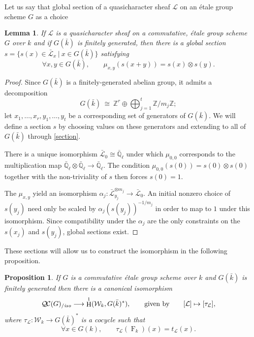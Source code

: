\documentclass[11pt]{amsart}
\theoremstyle{plain}
\newtheorem{proposition}[theorem]{Proposition}
\newtheorem{lemma}[theorem]{Lemma}
\theoremstyle{definition}
\theoremstyle{remark}
\newcommand{\ZZ}{{\mathbb{Z}}}
\newcommand{\EE}{\mathbb{\bar Q}_\ell}
\newcommand{\bFq}{\bar{k}}
\newcommand{\Fq}{k}
\newcommand{\Frob}[1]{\operatorname{F}_{#1}}
\DeclareMathOperator{\Hh}{H}
\newcommand{\cdef}[1]{ {#1}\index{#1} }
\newcommand{\tq}{{\ \vert\ }}
\newcommand{\iso}{{\ \cong\ }}
\newcommand{\cs}[1]{{\mathcal{#1}}}
\newcommand{\gcs}[1]{{\mathcal{\bar #1}}}
\newcommand{\QC}{{\mathcal{Q\hskip-0.8pt C}}}
\newcommand{\QCiso}[1]{\QC(#1)_{/\textit{iso}}}
\newcommand{\Weil}[1]{\mathcal{W}_{#1}}
\newcommand{\trFrob}[1]{t_{#1}}
\begin{document}
Let us say that \cdef{global section}
of a quasicharacter sheaf $\cs{L}$ on an \'etale group scheme $G$ as a choice 


\begin{lemma}\label{lemma:section}
 If $\cs{L}$ is a quasicharacter sheaf on a commutative, \'etale group scheme $G$ over $\Fq$ and if $G(\bFq)$ is finitely generated, then there is a global section $s = \{ s(x) \in \gcs{L}_x \tq x \in G(\bFq) \}$ satisfying
 \begin{equation}\label{section}
  \forall x,y \in G(\bFq), \qquad \mu_{x,y}(s(x+y)) = s(x)\otimes s(y).
 \end{equation}
\end{lemma}

\begin{proof}
  Since $G(\bFq)$ is a finitely-generated abelian group, it admits a decomposition
  \[
  G(\bFq) \iso \ZZ^r \oplus \bigoplus_{j=1}^t \ZZ / m_j \ZZ;
  \]
  let $x_1, \ldots, x_r, y_1, \ldots, y_t$ be a corresponding set of generators of $G(\bFq)$.
  We will define a section $s$ by choosing values on these generators and extending to all
  of $G(\bFq)$ through \eqref{section}.
  
  There is a unique isomorphism $\gcs{L}_0 \cong \EE$ under which $\mu_{0,0}$ corresponds
  to the multiplication map $\EE \otimes \EE \to \EE$.
  The condition $\mu_{0,0}(s(0)) = s(0) \otimes s(0)$ together with the non-triviality of $s$
  then forces $s(0) = 1$.
  
  The $\mu_{x,y}$ yield an isomorphism $\alpha_j : \gcs{L}_{y_j}^{\otimes m_j} \to \gcs{L}_0$.
  An initial nonzero choice of $s(y_j)$ need only be scaled by $\alpha_j(s(y_j))^{-1/m_j}$ in order to map to
  $1$ under this isomorphism.  Since compatibility under the $\alpha_j$ are the only constraints on the
  $s(x_j)$ and $s(y_j)$, global sections exist.
\end{proof}

These sections will allow us to construct the isomorphism in the following proposition.

\begin{proposition}\label{prop:etale}
  If $G$ is a commutative \'etale group scheme over $\Fq$ and
  $G(\bFq)$ is finitely generated then there is a canonical
  isomorphism
  \[
  \QCiso{G} \longrightarrow \Hh^1(\Weil{\Fq}, G(\bFq)^*),
  \qquad \text{given by}\qquad
  [\cs{L}] \mapsto [\tau_\cs{L}],
  \]
  where $\tau_\cs{L}: \Weil{\Fq}\to G(\bFq)^*$ is a cocycle such that
  \[
  \forall x\in G(\Fq), \qquad \tau_\cs{L}(\Frob{\Fq})(x) = \trFrob{\cs{L}}(x).
  \]
\end{proposition}
\end{document}

